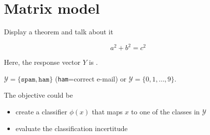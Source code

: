 \documentclass[unknownkeysallowed]{beamer}
\begin{document}

\section{Matrix model}
\label{sub:matrix}

\begin{frame}{Display a theorem and talk about it}

\vspace{0.4cm}

{
\begin{equation*}
a^2 + b^2 = c^2
\end{equation*}
}

\vspace{0.25cm}

Here, the response vector $Y$ is .

\vspace{0.25cm}

\exple
$\mathcal{Y} = \{\texttt{spam},  \texttt{ham}\}$ (\texttt{ham}=correct e-mail) or $\mathcal{Y}= \{0, 1, \dots,9\}$.

The objective could be
\begin{itemize}
	\item create a classifier $\phi(x)$ that maps $x$ to one of the classes in $\mathcal{Y}$
	\item evaluate the classification incertitude %
\end{itemize}


\end{frame}
\end{document}

